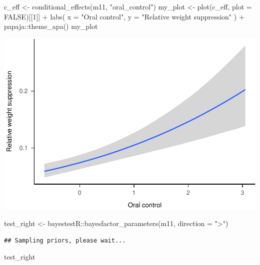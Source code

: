 \documentclass[
]{article}
\newenvironment{Shaded}{\begin{snugshade}}{\end{snugshade}}
\newcommand{\AttributeTok}[1]{\textcolor[rgb]{0.77,0.63,0.00}{#1}}
\newcommand{\ConstantTok}[1]{\textcolor[rgb]{0.00,0.00,0.00}{#1}}
\newcommand{\DecValTok}[1]{\textcolor[rgb]{0.00,0.00,0.81}{#1}}
\newcommand{\FunctionTok}[1]{\textcolor[rgb]{0.00,0.00,0.00}{#1}}
\newcommand{\NormalTok}[1]{#1}
\newcommand{\OtherTok}[1]{\textcolor[rgb]{0.56,0.35,0.01}{#1}}
\newcommand{\SpecialCharTok}[1]{\textcolor[rgb]{0.00,0.00,0.00}{#1}}
\newcommand{\StringTok}[1]{\textcolor[rgb]{0.31,0.60,0.02}{#1}}
\begin{document}
\begin{Shaded}
\begin{Highlighting}[]
\NormalTok{c\_eff }\OtherTok{\textless{}{-}} \FunctionTok{conditional\_effects}\NormalTok{(m11, }\StringTok{"oral\_control"}\NormalTok{)}
\NormalTok{my\_plot }\OtherTok{\textless{}{-}} \FunctionTok{plot}\NormalTok{(c\_eff, }\AttributeTok{plot =} \ConstantTok{FALSE}\NormalTok{)[[}\DecValTok{1}\NormalTok{]] }\SpecialCharTok{+}
  \FunctionTok{labs}\NormalTok{(}
    \AttributeTok{x =} \StringTok{"Oral control"}\NormalTok{,}
    \AttributeTok{y =} \StringTok{"Relative weight suppression"}
\NormalTok{  ) }\SpecialCharTok{+}
\NormalTok{  papaja}\SpecialCharTok{::}\FunctionTok{theme\_apa}\NormalTok{()}
\NormalTok{my\_plot}
\end{Highlighting}
\end{Shaded}

\includegraphics{046_weight_history_alpha_files/figure-latex/unnamed-chunk-11-1.pdf}

\begin{Shaded}
\begin{Highlighting}[]
\NormalTok{test\_right }\OtherTok{\textless{}{-}}\NormalTok{ bayestestR}\SpecialCharTok{::}\FunctionTok{bayesfactor\_parameters}\NormalTok{(m11, }\AttributeTok{direction =} \StringTok{"\textgreater{}"}\NormalTok{)}
\end{Highlighting}
\end{Shaded}

\begin{verbatim}
## Sampling priors, please wait...
\end{verbatim}

\begin{Shaded}
\begin{Highlighting}[]
\NormalTok{test\_right}
\end{Highlighting}
\end{Shaded}
\end{document}
